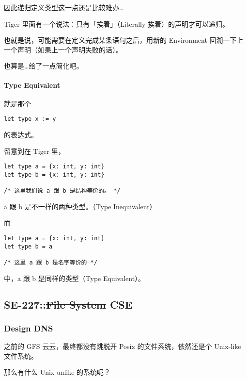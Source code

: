 \documentclass[
]{article}
\begin{document}
因此递归定义类型这一点还是比较难办\ldots{}

Tiger 里面有一个说法：只有「挨着」（Literally 挨着）的声明才可以递归。

也就是说，可能需要在定义完成某条语句之后，用新的 Environment
回溯一下上一个声明（如果上一个声明失败的话）。

也算是\ldots 给了一点简化吧。

\hypertarget{header-n77}{%
\paragraph{Type Equivalent}\label{header-n77}}

就是那个

\begin{verbatim}
let type x := y
\end{verbatim}

的表达式。

留意到在 Tiger 里，

\begin{verbatim}
let type a = {x: int, y: int}
let type b = {x: int, y: int}

/* 这里我们说 a 跟 b 是结构等价的。 */
\end{verbatim}

a 跟 b 是不一样的两种类型。（Type Inequivalent）

而

\begin{verbatim}
let type a = {x: int, y: int}
let type b = a

/* 这里 a 跟 b 是名字等价的 */
\end{verbatim}

中，a 跟 b 是同样的类型（Type Equivalent）。

\hypertarget{header-n87}{%
\subsection{\texorpdfstring{SE-227::\sout{File System}
CSE}{SE-227::File System CSE}}\label{header-n87}}

\hypertarget{header-n88}{%
\subsubsection{Design DNS}\label{header-n88}}

之前的 GFS 云云，最终都没有跳脱开 Posix 的文件系统，依然还是个 Unix-like
文件系统。

那么有什么 Unix-unlike 的系统呢？
\end{document}
